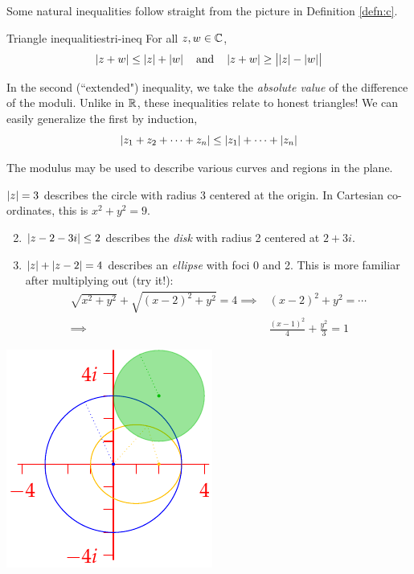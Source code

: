 Some natural inequalities follow straight from the picture in Definition \ref{defn:c}.

\begin{lemm}{Triangle inequalities}{tri-ineq}
	For all $z,w\in\mathbb{C}$,
	\[
		\left| z+w\right|\le \left| z\right|+\left| w\right|
		\quad\text{and}\quad
		\left| z+w\right|\ge \bigl|\left| z\right|-\left| w\right|\bigr|
	\]
\end{lemm}

In the second (``extended") inequality, we take the \emph{absolute value} of the difference of the moduli. Unlike in $\mathbb{R}$, these inequalities relate to honest triangles! We can easily generalize the first by induction,
\[
	\left| z_1+z_2+\cdots +z_n\right|\le\left| z_1\right|+\cdots+\left| z_n\right|
\]

The modulus may be used to describe various curves and regions in the plane. 

\begin{examples}[lower separated=false, sidebyside, sidebyside align=top seam, sidebyside gap=0pt, righthand width=0.3\linewidth]{}{}
	\exstart \textcolor{blue}{$\left| z\right|=3$} describes the circle with radius 3 centered at the origin. In Cartesian co-ordinates, this is $x^2+y^2=9$.
	\begin{enumerate}\setcounter{enumi}{1}
	  \item \textcolor{Green}{$\left| z-2-3i\right|\le 2$} describes the \emph{disk} with radius 2 centered at $2+3i$.
	  \item \textcolor{orange}{$\left| z\right|+\left| z-2\right|=4$} describes an \emph{ellipse} with foci 0 and 2. This is more familiar after multiplying out (try it!):
	  \begin{align*}
		  \sqrt{x^2+y^2}+\sqrt{(x-2)^2+y^2}=4 \implies
		  	&
		  (x-2)^2+y^2=\cdots\\%
		  \implies &\frac{(x-1)^2}4+\frac{y^2}3=1
	  \end{align*}
	\end{enumerate}
	\tcblower
	\flushright\includegraphics{intro-modulus3}
\end{examples}





